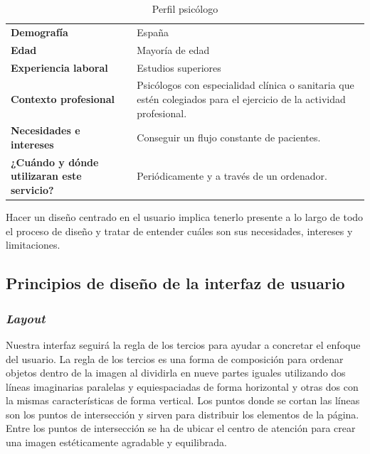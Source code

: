 \begin{table}[htpb]
\centering
\begin{tabularx}{\textwidth}{|X|X|}
\hline
\rowcolor[gray]{0.9}\multicolumn{2}{|c|}{\textbf{Psicólogos}}                                                                                                                                 \\ \hline
\textbf{Demografía}                                & España                                                                                                               \\ \hline
\textbf{Edad}                                      & Mayoría de edad                                                                                                      \\ \hline
\textbf{Experiencia laboral}                       & Estudios superiores                                                                                                  \\ \hline
\textbf{Contexto profesional}                      & Psicólogos con especialidad clínica o sanitaria que estén colegiados para el ejercicio de la actividad profesional. \\ \hline
\textbf{Necesidades e intereses}                   & Conseguir un flujo constante de pacientes.                                                                           \\ \hline
\textbf{¿Cuándo y dónde utilizaran este servicio?} & Periódicamente y a través de un ordenador.                                                                           \\ \hline
\end{tabularx}
\caption{Perfil psicólogo}
\label{perf_psic}
\end{table}


Hacer un diseño centrado en el usuario implica tenerlo presente a lo largo de todo el proceso de diseño y tratar de entender cuáles son sus necesidades, intereses y limitaciones.


\subsection{Principios de diseño de la interfaz de usuario}

\subsubsection{\textit{Layout}}
Nuestra interfaz seguirá la regla de los tercios para ayudar a concretar el enfoque del usuario. La regla de los tercios es una forma de composición para ordenar objetos dentro de la imagen al dividirla en nueve partes iguales utilizando dos líneas imaginarias paralelas y equiespaciadas de forma horizontal y otras dos con la mismas características de forma vertical. Los puntos donde se cortan las líneas son los puntos de intersección y sirven para distribuir los elementos de la página. Entre los puntos de intersección se ha de ubicar el centro de atención para crear una imagen estéticamente agradable y equilibrada\cite{georgefield1845}.


